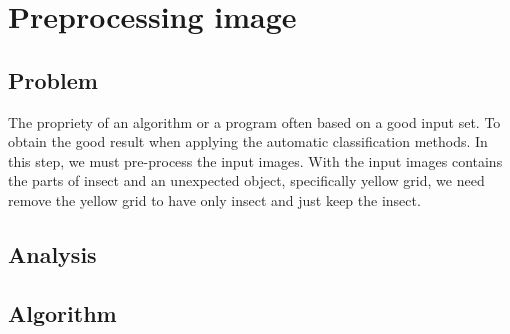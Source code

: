 \chapter{Preprocessing image}
\section{Problem}
The propriety of an algorithm or a program often based on a good input set. To obtain the good result when applying the automatic classification methods. In this step, we must pre-process the input images. With the input images contains the parts of insect and an unexpected object, specifically yellow grid, we need remove the yellow grid to have only insect and just keep the insect.
\section{Analysis}
\section{Algorithm}